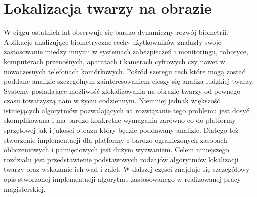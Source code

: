 \section{Lokalizacja twarzy na obrazie}
\label{sec:face-detect}
W ciągu ostatnich lat obserwuje się bardzo dynamiczny rozwój biometrii.
Aplikacje analizujące biometryczne cechy użytkowników znalazły swoje
zastosowanie miedzy innymi w systemach zabezpieczeń i monitoringu, robotyce,
komputerach przenośnych, aparatach i kamerach cyfrowych czy nawet w nowoczesnych
telefonach komórkowych. Pośród szeregu cech które mogą zostać poddane analizie
szczególnym zainteresowaniem cieszy się analiza ludzkiej twarzy. Systemy
posiadające możliwość zlokalizowania na obrazie twarzy od pewnego czasu
towarzyszą nam w życiu codziennym. Niemniej jednak większość istniejących
algorytmów pozwalających na rozwiązanie tego problemu jest
dosyć skomplikowana i ma bardzo konkretne wymagania zarówno co do platformy sprzętowej
jak i jakości obrazu który będzie poddawany analizie. Dlatego też stworzenie
implementacji dla platformy o bardzo ograniczonych zasobach obliczeniowych i
pamięciowych jest dużym wyzwaniem. Celem niniejszego rozdziału jest
przedstawienie podstawowych rodzajów algorytmów lokalizacji twarzy oraz
wskazanie ich wad i zalet. W dalszej części znajduje się szczegółowy opis
stworzonej implementacji algorytmu zastosowanego w realizowanej pracy magisterskiej.

